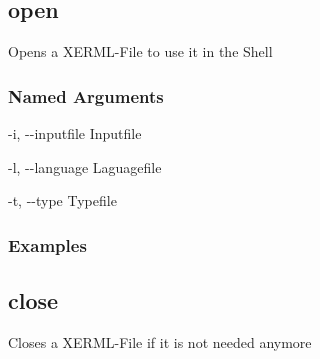 \documentclass[letterpaper,10pt,english,openany,oneside]{sphinxmanual}
\begin{document}
\subsection{open}
\label{\detokenize{cmd_main:open}}
Opens a XERML-File to use it in the Shell

\begin{sphinxVerbatim}[commandchars=\\\{\}]
  \PYG{p}{[}\PYG{p}{]} \PYG{p}{[} \PYG{p}{]} \PYG{p}{[} \PYG{p}{]} \PYG{p}{[} \PYG{p}{]}
\end{sphinxVerbatim}


\subsubsection{Named Arguments}
\label{\detokenize{cmd_main:Named Arguments_repeat2}}\begin{optionlist}{3cm}
\item [-i, -{-}inputfile]  
Inputfile
\item [-l, -{-}language]  
Laguagefile
\item [-t, -{-}type]  
Typefile
\end{optionlist}

\subsubsection{Examples}
\begin{sphinxVerbatim}[commandchars=\\\{\}]
    
\end{sphinxVerbatim}
\begin{sphinxVerbatim}[commandchars=\\\{\}]
   
\end{sphinxVerbatim}

\subsection{close}
\label{\detokenize{cmd_main:close}}
Closes a XERML-File if it is not needed anymore

\begin{sphinxVerbatim}[commandchars=\\\{\}]
  \PYG{p}{[}\PYG{p}{]} \PYG{p}{[}\PYG{p}{]} \PYG{p}{[}\PYG{p}{]}
\end{sphinxVerbatim}
\end{document}
